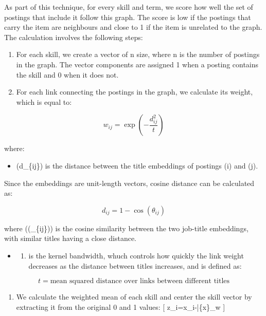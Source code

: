 \documentclass[
  letterpaper,
  DIV=11,
  numbers=noendperiod,
  sfdefaults=false]{scrartcl}
\providecommand{\tightlist}{%
  \setlength{\itemsep}{0pt}\setlength{\parskip}{0pt}}
\begin{document}
As part of this technique, for every skill and term, we score how well
the set of postings that include it follow this graph. The score is low
if the postings that carry the item are neighbours and close to 1 if the
item is unrelated to the graph. The calculation involves the following
steps:

\begin{enumerate}
\def\labelenumi{(\alph{enumi})}
\item
  For each skill, we create a vector of n size, where n is the number of
  postings in the graph. The vector components are assigned 1 when a
  posting contains the skill and 0 when it does not.
\item
  For each link connecting the postings in the graph, we calculate its
  weight, which is equal to:
\end{enumerate}

\[
w_{ij} = \exp\left(-\frac{d_{ij}^{2}}{t}\right)
\]

where:

\begin{itemize}
\tightlist
\item
  (d\_\{ij\}) is the distance between the title embeddings of postings
  (i) and (j).
\end{itemize}

Since the embeddings are unit-length vectors, cosine distance can be
calculated as:

\[
d_{ij} = 1 - \cos(\theta_{ij})
\]

where (\cos(\theta\_\{ij\})) is the cosine similarity between the two
job-title embeddings, with similar titles having a close distance.

\begin{itemize}
\tightlist
\item
  \begin{enumerate}
  \def\labelenumi{(\alph{enumi})}
  \setcounter{enumi}{19}
  \tightlist
  \item
    is the kernel bandwidth, whuch controls how quickly the link weight
    decreases as the distance between titles increases, and is defined
    as:
  \end{enumerate}
\end{itemize}

\[
t = \text{mean squared distance over links between different titles}
\]

\begin{enumerate}
\def\labelenumi{(\alph{enumi})}
\setcounter{enumi}{2}
\tightlist
\item
  We calculate the weighted mean of each skill and center the skill
  vector by extracting it from the original 0 and 1 values: {[}
  z\_i=x\_i-\bar\{x\}\_w {]}
\end{enumerate}
\end{document}
